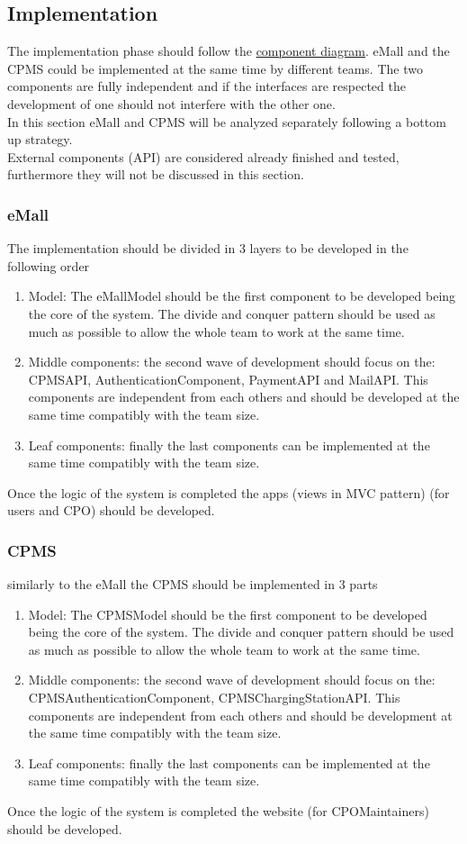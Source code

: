 \subsection{Implementation}
The implementation phase should follow the \hyperref[fig:eMSP-component]{component diagram}. \ac{eMall} and the \ac{CPMS} could be implemented at the same time by different teams. The two components are fully independent and if the interfaces are respected the development of one should not interfere with the other one.\\
In this section \ac{eMall} and \ac{CPMS} will be analyzed separately following a bottom up strategy.\\
External components (\ac{API}) are considered already finished and tested, furthermore they will not be discussed in this section.
\subsubsection{eMall}
The implementation should be divided in 3 layers to be developed in the following order
\begin{enumerate}
    \item Model: The eMallModel should be the first component to be developed being the core of the system. The divide and conquer pattern should be used as much as possible to allow the whole team to work at the same time.
    \item Middle components: the second wave of development should focus on the: \ac{CPMS}\ac{API}, AuthenticationComponent, Payment\ac{API} and Mail\ac{API}. This components are independent from each others and should be developed at the same time compatibly with the team size.
    \item Leaf components: finally the last components can be implemented at the same time compatibly with the team size.
\end{enumerate}
Once the logic of the system is completed the apps (views in \ac{MVC} pattern) (for users and \ac{CPO}) should be developed.
\subsubsection{CPMS}
similarly to the \ac{eMall} the \ac{CPMS} should be implemented in 3 parts
\begin{enumerate}
    \item Model: The CPMSModel should be the first component to be developed being the core of the system. The divide and conquer pattern should be used as much as possible to allow the whole team to work at the same time.
    \item Middle components: the second wave of development should focus on the: CPMSAuthenticationComponent, CPMSChargingStation\ac{API}. This components are independent from each others and should be development at the same time compatibly with the team size.
    \item Leaf components: finally the last components can be implemented at the same time compatibly with the team size.
\end{enumerate}
Once the logic of the system is completed the website (for \ac{CPO}Maintainers) should be developed.
